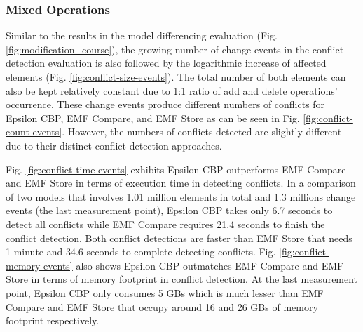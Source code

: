 \subsubsection{Mixed Operations}
\label{sec:mixed-operation_conflict}
Similar to the results in the model differencing evaluation (Fig. \ref{fig:modification_course}), the growing number of change events in the conflict detection evaluation is also followed by the logarithmic increase of affected elements (Fig. \ref{fig:conflict-size-events}). The total number of both elements can also be kept relatively constant due to 1:1 ratio of \textsf{add} and \textsf{delete} operations' occurrence. These change events produce different numbers of conflicts for Epsilon CBP, EMF Compare, and EMF Store as can be seen in Fig. \ref{fig:conflict-count-events}. However, the numbers of conflicts detected are slightly different due to their distinct conflict detection approaches. 

Fig. \ref{fig:conflict-time-events} exhibits Epsilon CBP outperforms EMF Compare and EMF Store in terms of execution time in detecting conflicts. In a comparison of two models that involves 1.01 million elements in total and 1.3 millions change events (the last measurement point), Epsilon CBP takes only 6.7 seconds to detect all conflicts while EMF Compare requires 21.4 seconds to finish the conflict detection. Both conflict detections are faster than EMF Store that needs 1 minute and 34.6 seconds to complete detecting conflicts. Fig. \ref{fig:conflict-memory-events} also shows Epsilon CBP outmatches EMF Compare and EMF Store in terms of memory footprint in conflict detection. At the last measurement point, Epsilon CBP only consumes 5 GBs which is much lesser than EMF Compare and EMF Store that occupy around 16 and 26 GBs of memory footprint respectively.

